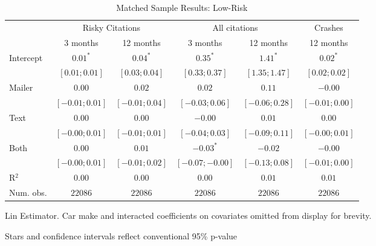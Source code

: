 
\begin{table}
\caption{Matched Sample Results: Low-Risk}
\begin{center}
\begin{threeparttable}
\begin{tabular}{l c c c c c}
\hline
 & \multicolumn{2}{c}{Risky Citations} & \multicolumn{2}{c}{All citations} & \multicolumn{1}{c}{Crashes} \\
\cline{2-3} \cline{4-5} \cline{6-6}
 & 3 months & 12 months & 3 months & 12 months & 12 months \\
\hline
Intercept & $0.01^{*}$       & $0.04^{*}$       & $0.35^{*}$        & $1.41^{*}$       & $0.02^{*}$       \\
          & $ [ 0.01; 0.01]$ & $ [ 0.03; 0.04]$ & $ [ 0.33;  0.37]$ & $ [ 1.35; 1.47]$ & $ [ 0.02; 0.02]$ \\
Mailer    & $0.00$           & $0.02$           & $0.02$            & $0.11$           & $-0.00$          \\
          & $ [-0.01; 0.01]$ & $ [-0.01; 0.04]$ & $ [-0.03;  0.06]$ & $ [-0.06; 0.28]$ & $ [-0.01; 0.00]$ \\
Text      & $0.00$           & $0.00$           & $-0.00$           & $0.01$           & $0.00$           \\
          & $ [-0.00; 0.01]$ & $ [-0.01; 0.01]$ & $ [-0.04;  0.03]$ & $ [-0.09; 0.11]$ & $ [-0.00; 0.01]$ \\
Both      & $0.00$           & $0.01$           & $-0.03^{*}$       & $-0.02$          & $-0.00$          \\
          & $ [-0.00; 0.01]$ & $ [-0.01; 0.02]$ & $ [-0.07; -0.00]$ & $ [-0.13; 0.08]$ & $ [-0.01; 0.00]$ \\
\hline
R$^2$     & $0.00$           & $0.00$           & $0.00$            & $0.01$           & $0.01$           \\
Num. obs. & $22086$          & $22086$          & $22086$           & $22086$          & $22086$          \\
\hline
\end{tabular}
\begin{tablenotes}[flushleft]
\scriptsize{\item Lin Estimator. Car make and interacted coefficients on covariates omitted from display for brevity.
                             \item Stars and confidence intervals reflect conventional 95\% p-value}
\end{tablenotes}
\end{threeparttable}
\label{table:coefficients}
\end{center}
\end{table}

